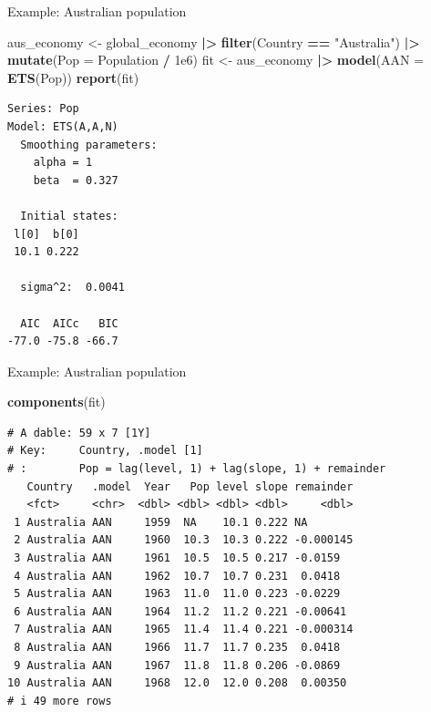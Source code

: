 \documentclass[
  14pt,
  ignorenonframetext,
  aspectratio=169,
]{beamer}
\newenvironment{Shaded}{\begin{snugshade}}{\end{snugshade}}
\newcommand{\AttributeTok}[1]{\textcolor[rgb]{0.13,0.29,0.53}{#1}}
\newcommand{\FloatTok}[1]{\textcolor[rgb]{0.00,0.00,0.81}{#1}}
\newcommand{\FunctionTok}[1]{\textcolor[rgb]{0.13,0.29,0.53}{\textbf{#1}}}
\newcommand{\NormalTok}[1]{#1}
\newcommand{\OtherTok}[1]{\textcolor[rgb]{0.56,0.35,0.01}{#1}}
\newcommand{\SpecialCharTok}[1]{\textcolor[rgb]{0.81,0.36,0.00}{\textbf{#1}}}
\newcommand{\StringTok}[1]{\textcolor[rgb]{0.31,0.60,0.02}{#1}}
\renewenvironment{Shaded}{\vspace*{0.15cm}\color{black}\fontsize{10}{10}\sf\begin{snugshade}\color{black}}{\end{snugshade}}
\begin{document}
\begin{frame}[fragile]{Example: Australian population}
\protect{}\label{example-australian-population}
\fontsize{9}{9}\sf

\begin{Shaded}
\begin{Highlighting}[]
\NormalTok{aus\_economy }\OtherTok{\textless{}{-}}\NormalTok{ global\_economy }\SpecialCharTok{|\textgreater{}}
  \FunctionTok{filter}\NormalTok{(Country }\SpecialCharTok{==} \StringTok{"Australia"}\NormalTok{) }\SpecialCharTok{|\textgreater{}}
  \FunctionTok{mutate}\NormalTok{(}\AttributeTok{Pop =}\NormalTok{ Population }\SpecialCharTok{/} \FloatTok{1e6}\NormalTok{)}
\NormalTok{fit }\OtherTok{\textless{}{-}}\NormalTok{ aus\_economy }\SpecialCharTok{|\textgreater{}} \FunctionTok{model}\NormalTok{(}\AttributeTok{AAN =} \FunctionTok{ETS}\NormalTok{(Pop))}
\FunctionTok{report}\NormalTok{(fit)}
\end{Highlighting}
\end{Shaded}

\begin{verbatim}
Series: Pop 
Model: ETS(A,A,N) 
  Smoothing parameters:
    alpha = 1 
    beta  = 0.327 

  Initial states:
 l[0]  b[0]
 10.1 0.222

  sigma^2:  0.0041

  AIC  AICc   BIC 
-77.0 -75.8 -66.7 
\end{verbatim}
\end{frame}

\begin{frame}[fragile]{Example: Australian population}
\protect{}\label{example-australian-population-1}
\fontsize{10}{11}\sf

\begin{Shaded}
\begin{Highlighting}[]
\FunctionTok{components}\NormalTok{(fit)}
\end{Highlighting}
\end{Shaded}

\begin{verbatim}
# A dable: 59 x 7 [1Y]
# Key:     Country, .model [1]
# :        Pop = lag(level, 1) + lag(slope, 1) + remainder
   Country   .model  Year   Pop level slope remainder
   <fct>     <chr>  <dbl> <dbl> <dbl> <dbl>     <dbl>
 1 Australia AAN     1959  NA    10.1 0.222 NA       
 2 Australia AAN     1960  10.3  10.3 0.222 -0.000145
 3 Australia AAN     1961  10.5  10.5 0.217 -0.0159  
 4 Australia AAN     1962  10.7  10.7 0.231  0.0418  
 5 Australia AAN     1963  11.0  11.0 0.223 -0.0229  
 6 Australia AAN     1964  11.2  11.2 0.221 -0.00641 
 7 Australia AAN     1965  11.4  11.4 0.221 -0.000314
 8 Australia AAN     1966  11.7  11.7 0.235  0.0418  
 9 Australia AAN     1967  11.8  11.8 0.206 -0.0869  
10 Australia AAN     1968  12.0  12.0 0.208  0.00350 
# i 49 more rows
\end{verbatim}
\end{frame}
\end{document}
